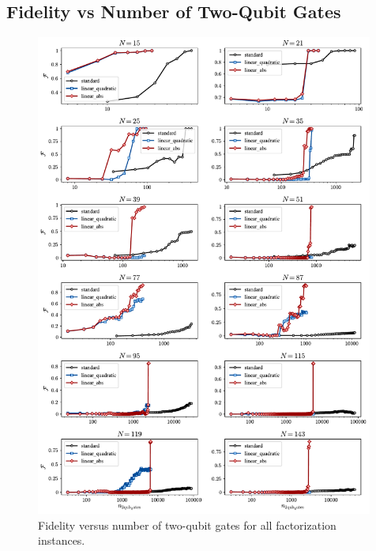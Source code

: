 \subsection*{Fidelity vs Number of Two-Qubit Gates}
\begin{figure}[H]
    \centering
    \includegraphics[width=0.99\textwidth]{06-appendix/figs/fidelity_gates_all.pdf}
    \caption{Fidelity versus number of two-qubit gates for all factorization instances.}
    \label{fig:fidelity_gates_all}
\end{figure}